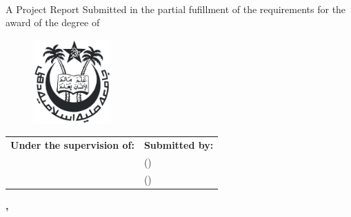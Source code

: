 \begin{titlepage}
    \begin{center}
        \begin{chaptersize}
            \textbf{\projectTitle{}}\\[\baselineskip]
        \end{chaptersize}
        \begin{sectionsize}
            A Project Report\linebreak
            Submitted in the partial fufillment of the requirements for the award of the degree of\\[\baselineskip]
        \end{sectionsize}
        \begin{chaptersize}
            \textbf{\degreeName{}}
        \end{chaptersize}

        \vspace{20mm}
        \begin{figure}[H]
            \centering
            \includegraphics[width=30mm]{img/jmi.png}
        \end{figure}
        \vspace{20mm}

        \begin{sectionsize}
            \begin{center}
                \begin{tabularx}{\textwidth}{L R}
                    \textbf{Under the supervision of:} & \textbf{Submitted by:}\\
                    \mentorName{}                      & \authorAshhar{} (\authorAshharRoll{})\\
                    \mentorJobTitle{}                  & \authorAdeela{} (\authorAdeelaRoll{})
                \end{tabularx}
            \end{center}

            \vfill

            \textbf{%
                \departmentName{}\linebreak
                \facultyName{}\linebreak
                \collegeName{}, \cityNamePin{}
            }
        \end{sectionsize}
    \end{center}
\end{titlepage}

